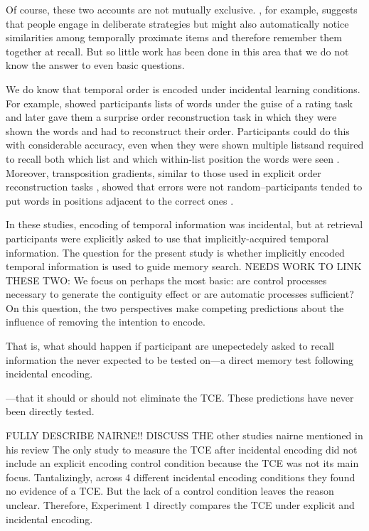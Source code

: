 \documentclass[jou,natbib,floatsintext]{apa6} %
\begin{document}
Of course, these two accounts are not mutually exclusive. \citet{Hint16}, for example, suggests that people engage in deliberate strategies but might also automatically notice similarities among temporally proximate items and therefore remember them together at recall. But so little work has been done in this area that we do not know the answer to even basic questions. 


We do know that temporal order is encoded under incidental learning conditions. For example, \citet{Nair91, Nair90b, NairEtal17} showed participants lists of words under the guise of a rating task and later gave them a surprise order reconstruction task in which they were shown the words and had to reconstruct their order. Participants could do this with considerable accuracy, even when they were shown multiple listsand required to recall both which list and which within-list position the words were seen \citet{Nair91}. Moreover, transposition gradients, similar to those used in explicit order reconstruction tasks \cite{Heal74}, showed that errors were not random--participants tended to put words in positions adjacent to the correct ones \citet{Nair91}. 

In these studies, encoding of temporal information was incidental, but at retrieval participants were explicitly asked to use that implicitly-acquired temporal information. The question for the present study is whether implicitly encoded temporal information is used to guide memory search.
NEEDS WORK TO LINK THESE TWO:
We focus on perhaps the most basic: are control processes necessary to generate the contiguity effect or are automatic processes sufficient? On this question, the two perspectives make competing predictions about the influence of removing the intention to encode. 

\label{TODO-3} %
That is, what should happen if participant are unepectedely asked to recall information the never expected to be tested on---a direct memory test following incidental encoding.


---that it should or should not eliminate the TCE. These predictions have never been directly tested. 

\label{TODO-4} FULLY DESCRIBE NAIRNE!!
\label{TODO-8} DISCUSS THE other studies nairne mentioned in his review
The only study to measure the TCE after incidental encoding \citep{NairEtal17} did not include an explicit encoding control condition because the TCE was not its main focus. Tantalizingly, across 4 different incidental encoding conditions they found no evidence of a TCE. But the lack of a control condition leaves the reason unclear. Therefore, Experiment 1 directly compares the TCE under explicit and incidental encoding.
\end{document}
